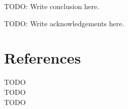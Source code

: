 \documentclass{article}
\begin{document}
TODO: Write conclusion here.


\begin{ack}
TODO: Write acknowledgements here.
\end{ack}


\section*{References}

\begin{small}
[1] TODO \\
[2] TODO \\
[3] TODO \\
\end{small}

\newpage

\end{document}
